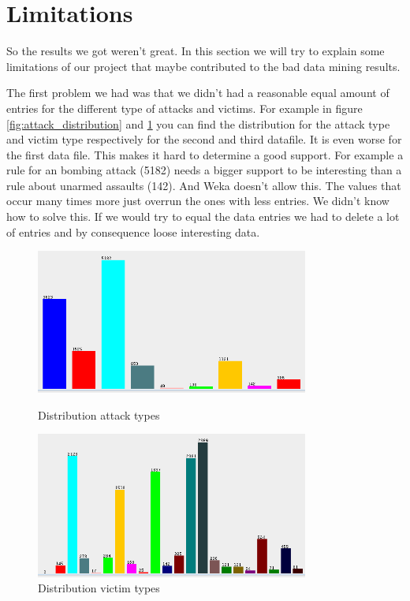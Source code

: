 \documentclass[a4]{article}
\begin{document}
\section{Limitations}
\label{sec:limitations}
So the results we got weren't great. In this section we will try to explain some limitations of our project that maybe contributed to the bad data mining results.\par
The first problem we had was that we didn't had a reasonable equal amount of entries for the different type of attacks and victims. For example in figure \ref{fig:attack_distribution} and \ref{fig:victim_distribution} you can find the distribution for the attack type and victim type respectively for the second and third datafile. It is even worse for the first data file. This makes it hard to determine a good support. For example a rule for an bombing attack (5182) needs a bigger support to be interesting than a rule about unarmed assaults (142). And Weka doesn't allow this. The values that occur many times more just overrun the ones with less entries. We didn't know how to solve this. If we would try to equal the data entries we had to delete a lot of entries and by consequence loose interesting data.\par
\begin{figure}[!h]
\centering
\begin{minipage}{0.49\textwidth}
  \centering
  \includegraphics[width=0.8\textwidth]{images/attacktype.png}
  \caption{Distribution attack types}
  \label{fig:attack_distribution}
\end{minipage}
\begin{minipage}{0.49\textwidth}
  \centering
  \includegraphics[width=0.8\textwidth]{images/victimtype.png}
  \caption{Distribution victim types}
  \label{fig:victim_distribution}
\end{minipage}
\end{figure}
\end{document}
